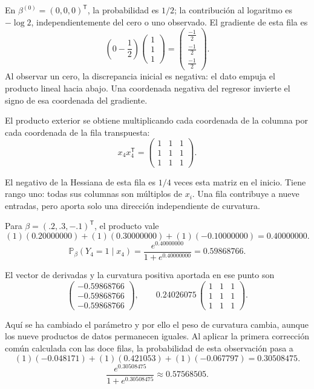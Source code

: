 \documentclass[11pt,a4paper]{article}
\newcommand{\Prob}{\mathbb P}
\newcommand{\T}{^{\mathsf T}}
\begin{document}
En \(\beta^{(0)}=(0,0,0)\T\), la probabilidad es \(1/2\);
la contribución al logaritmo es \(-\log2\), independientemente
del cero o uno observado. El gradiente de esta fila es
\[
\left(0-\frac12\right)\begin{pmatrix}1\\1\\1\end{pmatrix}=\begin{pmatrix}\frac{-1}{2}\\\frac{-1}{2}\\\frac{-1}{2}\end{pmatrix}.
\]
Al observar un cero, la discrepancia inicial es negativa: el dato empuja el producto lineal hacia abajo. Una coordenada negativa del regresor invierte el signo de esa coordenada del gradiente.

El producto exterior se obtiene multiplicando cada coordenada
de la columna por cada coordenada de la fila transpuesta:
\[
x_{4}x_{4}\T=\begin{pmatrix}1&1&1\\1&1&1\\1&1&1\end{pmatrix}.
\]

El negativo de la Hessiana de esta fila es \(1/4\)
veces esta matriz en el inicio. Tiene rango uno:
todas sus columnas son múltiplos de \(x_i\).
Una fila contribuye a nueve entradas, pero aporta
solo una dirección independiente de curvatura.

Para \(\beta=(.2,.3,-.1)\T\), el producto vale
\[
(1)(0.20000000)+(1)(0.30000000)+(1)(-0.10000000)=0.40000000.
\]
\[
\Prob_\beta(Y_{4}=1\mid x_{4})=\frac{e^{0.40000000}}{1+e^{0.40000000}}=0.59868766.
\]

El vector de derivadas y la curvatura positiva aportada
en ese punto son
\[
\begin{pmatrix}-0.59868766\\-0.59868766\\-0.59868766\end{pmatrix},\qquad 0.24026075\,\begin{pmatrix}1&1&1\\1&1&1\\1&1&1\end{pmatrix}.
\]

Aquí se ha cambiado el parámetro y por ello el peso de
curvatura cambia, aunque los nueve productos de datos
permanecen iguales.
Al aplicar la primera corrección común calculada con las doce filas,
la probabilidad de esta observación pasa a
\[
(1)(-0.048171)+(1)(0.421053)+(1)(-0.067797)=0.30508475.
\]
\[
\frac{e^{0.30508475}}{1+e^{0.30508475}}\approx0.57568505.
\]
\end{document}
